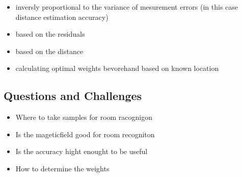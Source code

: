 \begin{itemize}
\item inversly proportional to the variance of mesurement errors (in this case distance estimation accuracy)
\item based on the residuals
\item based on the distance
\item calculating optimal weights bevorehand based on known location
\end{itemize}

\subsection{Questions and Challenges}
\begin{itemize}
\item Where to take samples for room racognigon 
\item Is the mageticfield good for room recogniton
\item Is the accuracy hight enought to be useful
\item How to determine the weights

\end{itemize}
